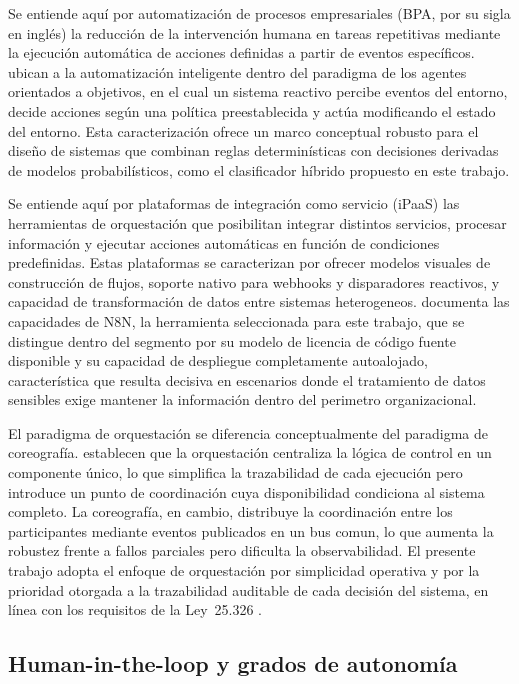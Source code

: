 Se entiende aquí por automatización de procesos empresariales (BPA, por su sigla en inglés) la reducción de la intervención humana en tareas repetitivas mediante la ejecución automática de acciones definidas a partir de eventos específicos. \textcite{Russell2021_ai_modern} ubican a la automatización inteligente dentro del paradigma de los agentes orientados a objetivos, en el cual un sistema reactivo percibe eventos del entorno, decide acciones según una política preestablecida y actúa modificando el estado del entorno. Esta caracterización ofrece un marco conceptual robusto para el diseño de sistemas que combinan reglas determinísticas con decisiones derivadas de modelos probabilísticos, como el clasificador híbrido propuesto en este trabajo.

Se entiende aquí por plataformas de integración como servicio (iPaaS) las herramientas de orquestación que posibilitan integrar distintos servicios, procesar información y ejecutar acciones automáticas en función de condiciones predefinidas. Estas plataformas se caracterizan por ofrecer modelos visuales de construcción de flujos, soporte nativo para webhooks y disparadores reactivos, y capacidad de transformación de datos entre sistemas heterogeneos. \textcite{n8n2024_docs} documenta las capacidades de N8N, la herramienta seleccionada para este trabajo, que se distingue dentro del segmento por su modelo de licencia de código fuente disponible y su capacidad de despliegue completamente autoalojado, característica que resulta decisiva en escenarios donde el tratamiento de datos sensibles exige mantener la información dentro del perimetro organizacional.

El paradigma de orquestación se diferencia conceptualmente del paradigma de coreografía. \textcite{Hohpe2003_eip} establecen que la orquestación centraliza la lógica de control en un componente único, lo que simplifica la trazabilidad de cada ejecución pero introduce un punto de coordinación cuya disponibilidad condiciona al sistema completo. La coreografía, en cambio, distribuye la coordinación entre los participantes mediante eventos publicados en un bus comun, lo que aumenta la robustez frente a fallos parciales pero dificulta la observabilidad. El presente trabajo adopta el enfoque de orquestación por simplicidad operativa y por la prioridad otorgada a la trazabilidad auditable de cada decisión del sistema, en línea con los requisitos de la Ley~25.326 \parencite{Ley25326_2000}.

\subsection{Human-in-the-loop y grados de autonomía}\label{subsec:human-in-the-loop}


